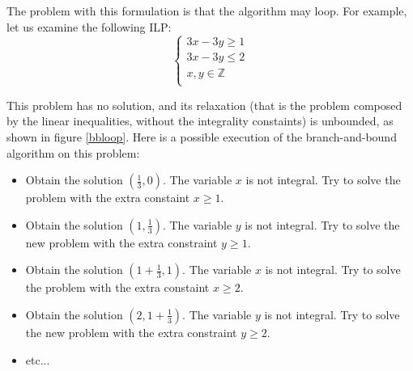 \documentclass{article}
\newcommand{\cunsat}{\texttt{Unsatisfiable}}
\newcommand{\ints}{\mathbb{Z}}
\begin{document}
%

The problem with this formulation is that the algorithm may loop. For example,
let us examine the following ILP:
\begin{equation} \label{pbloop}
  \left\{
  \begin{array}{l}
    3x - 3y \geqslant 1 \\
    3x - 3y \leqslant 2 \\
    x, y \in \ints \\
  \end{array}
  \right.
\end{equation}

This problem has no solution, and its relaxation (that is the problem composed
by the linear inequalities, without the integrality constaints) is unbounded, as
shown in figure \ref{bbloop}. Here is a possible execution of the
branch-and-bound algorithm on this problem:
\begin{itemize}
  \item Obtain the solution $(\frac{1}{3}, 0)$. The variable $x$ is not
    integral. Try to solve the problem with the extra constaint
    $x \geqslant 1$.
  \item Obtain the solution $(1, \frac{1}{3})$. The variable $y$ is not
    integral. Try to solve the new problem with the extra constraint $y
    \geqslant 1$.
  \item Obtain the solution $(1 + \frac{1}{3}, 1)$. The variable $x$ is not
    integral. Try to solve the problem with the extra constaint
    $x \geqslant 2$.
  \item Obtain the solution $(2, 1 + \frac{1}{3})$. The variable $y$ is not
    integral. Try to solve the new problem with the extra constraint $y
    \geqslant 2$.
  \item etc...
\end{itemize}
\end{document}
